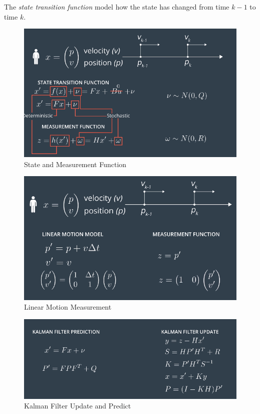 \documentclass[11pt, a4paper]{article}
\begin{document}
The \textit{state transition function} model how the state has changed from time $k-1$ to time $k$.


\begin{figure}[htpb!]
	\centering
	\includegraphics[width=0.8\linewidth]{state_and_measurement_func}
	\caption{State and Measurement Function}
	\label{fig:state_and_measurement_func}
\end{figure}





\begin{figure}[htpb!]
	\centering
	\includegraphics[width=0.8\linewidth]{linear_motion_measurement}
	\caption{Linear Motion Measurement}
	\label{fig:linear_motion_measurement}
\end{figure}



\begin{figure}[htpb!]
	\centering
	\includegraphics[width=0.8\linewidth]{KF_update_predict}
	\caption{Kalman Filter Update and Predict}
	\label{fig:KF_update_predict}
\end{figure}
\end{document}
